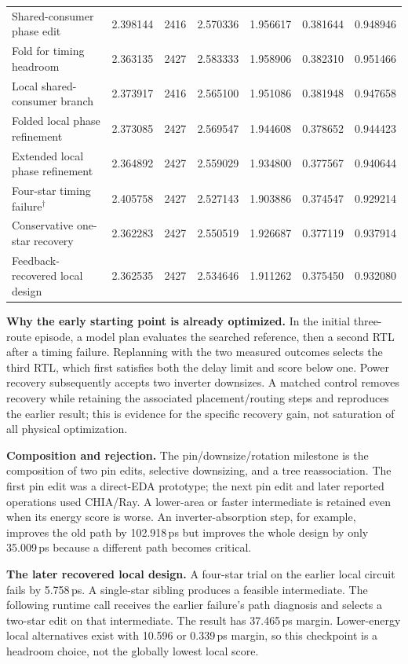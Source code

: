 \documentclass[10pt]{article}
\begin{document}
\begin{center}
\begin{tabular}{@{}>{\raggedright\arraybackslash}p{5.3cm}rrrrrr@{}}
Shared-consumer phase edit & 2.398144 & 2416 & 2.570336 & 1.956617 & 0.381644 & 0.948946\\
Fold for timing headroom & 2.363135 & 2427 & 2.583333 & 1.958906 & 0.382310 & 0.951466\\
Local shared-consumer branch & 2.373917 & 2416 & 2.565100 & 1.951086 & 0.381948 & 0.947658\\
Folded local phase refinement & 2.373085 & 2427 & 2.569547 & 1.944608 & 0.378652 & 0.944423\\
Extended local phase refinement & 2.364892 & 2427 & 2.559029 & 1.934800 & 0.377567 & 0.940644\\
Four-star timing failure$^{\dagger}$ & 2.405758 & 2427 & 2.527143 & 1.903886 & 0.374547 & 0.929214\\
Conservative one-star recovery & 2.362283 & 2427 & 2.550519 & 1.926687 & 0.377119 & 0.937914\\
Feedback-recovered local design & 2.362535 & 2427 & 2.534646 & 1.911262 & 0.375450 & 0.932080\\
\bottomrule\end{tabular}\end{center}
\textbf{Why the early starting point is already optimized.} In the initial three-route episode, a model plan evaluates the searched reference, then a second RTL after a timing failure. Replanning with the two measured outcomes selects the third RTL, which first satisfies both the delay limit and score below one. Power recovery subsequently accepts two inverter downsizes. A matched control removes recovery while retaining the associated placement/routing steps and reproduces the earlier result; this is evidence for the specific recovery gain, not saturation of all physical optimization.

\textbf{Composition and rejection.} The pin/downsize/rotation milestone is the composition of two pin edits, selective downsizing, and a tree reassociation. The first pin edit was a direct-EDA prototype; the next pin edit and later reported operations used CHIA/Ray. A lower-area or faster intermediate is retained even when its energy score is worse. An inverter-absorption step, for example, improves the old path by 102.918\,ps but improves the whole design by only 35.009\,ps because a different path becomes critical.

\textbf{The later recovered local design.} A four-star trial on the earlier local circuit fails by 5.758\,ps. A single-star sibling produces a feasible intermediate. The following runtime call receives the earlier failure's path diagnosis and selects a two-star edit on that intermediate. The result has 37.465\,ps margin. Lower-energy local alternatives exist with 10.596 or 0.339\,ps margin, so this checkpoint is a headroom choice, not the globally lowest local score.
\end{document}

